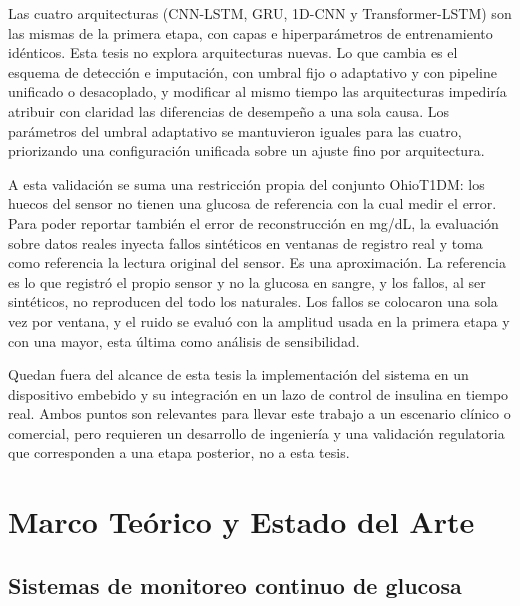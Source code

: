\documentclass{report}
\begin{document}
Las cuatro arquitecturas (CNN-LSTM, GRU, 1D-CNN y Transformer-LSTM) son las mismas de la primera etapa, con capas e hiperparámetros de entrenamiento idénticos. Esta tesis no explora arquitecturas nuevas. Lo que cambia es el esquema de detección e imputación, con umbral fijo o adaptativo y con pipeline unificado o desacoplado, y modificar al mismo tiempo las arquitecturas impediría atribuir con claridad las diferencias de desempeño a una sola causa. Los parámetros del umbral adaptativo se mantuvieron iguales para las cuatro, priorizando una configuración unificada sobre un ajuste fino por arquitectura.

A esta validación se suma una restricción propia del conjunto OhioT1DM: los huecos del sensor no tienen una glucosa de referencia con la cual medir el error. Para poder reportar también el error de reconstrucción en mg/dL, la evaluación sobre datos reales inyecta fallos sintéticos en ventanas de registro real y toma como referencia la lectura original del sensor. Es una aproximación. La referencia es lo que registró el propio sensor y no la glucosa en sangre, y los fallos, al ser sintéticos, no reproducen del todo los naturales. Los fallos se colocaron una sola vez por ventana, y el ruido se evaluó con la amplitud usada en la primera etapa y con una mayor, esta última como análisis de sensibilidad.

Quedan fuera del alcance de esta tesis la implementación del sistema en un dispositivo embebido y su integración en un lazo de control de insulina en tiempo real. Ambos puntos son relevantes para llevar este trabajo a un escenario clínico o comercial, pero requieren un desarrollo de ingeniería y una validación regulatoria que corresponden a una etapa posterior, no a esta tesis.

\chapter{Marco Teórico y Estado del Arte}

\section{Sistemas de monitoreo continuo de glucosa}
\label{sec:dmt1_cgm}
\end{document}
